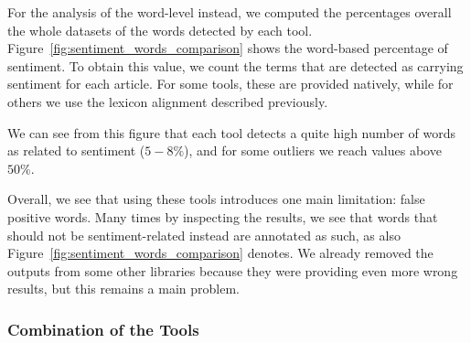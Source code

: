 For the analysis of the word-level instead, we computed the percentages overall the whole datasets of the words detected by each tool.
Figure~\ref{fig:sentiment_words_comparison} shows the word-based percentage of sentiment. To obtain this value, we count the terms that are detected as carrying sentiment for each article.
For some tools, these are provided natively, while for others we use the lexicon alignment described previously.

We can see from this figure that each tool detects a quite high number of words as related to sentiment ($5-8\%$), and for some outliers we reach values above $50\%$.




Overall, we see that using these tools introduces one main limitation: false positive words. Many times by inspecting the results, we see that words that should not be sentiment-related instead are annotated as such, as also Figure~\ref{fig:sentiment_words_comparison} denotes.
We already removed the outputs from some other libraries because they were providing even more wrong results, but this remains a main problem.


\subsubsection{\statusgreen Combination of the Tools}

